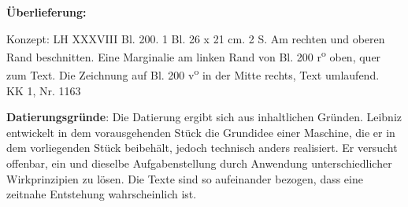       
               
                \begin{ledgroupsized}[r]{120mm}
                \footnotesize 
                \pstart                
                \noindent\textbf{\"{U}berlieferung:}   
                \pend
                \end{ledgroupsized}
            
              
                            \begin{ledgroupsized}[r]{114mm}
                            \footnotesize 
                            \pstart \parindent -6mm
                            Konzept: LH XXXVIII Bl. 200. 1 Bl. 26 x 21 cm. 2 S. Am rechten und oberen Rand beschnitten. Eine Marginalie am linken Rand von Bl. 200 r\textsuperscript{o} oben, quer zum Text. Die Zeichnung auf Bl. 200 v\textsuperscript{o} in der Mitte rechts, Text umlaufend.\\KK 1, Nr. 1163 \pend
                            \end{ledgroupsized}
                \vspace*{5mm}
                \begin{ledgroup}
                \footnotesize 
                \pstart
            \noindent\footnotesize{\textbf{Datierungsgr\"{u}nde}: Die Datierung ergibt sich aus inhaltlichen Gr\"{u}nden. Leibniz entwickelt in dem vorausgehenden St\"{u}ck die Grundidee einer Maschine, die er in dem vorliegenden St\"{u}ck beibeh\"{a}lt, jedoch technisch anders realisiert. Er versucht offenbar, ein und dieselbe Aufgabenstellung durch Anwendung unterschiedlicher Wirkprinzipien zu l\"{o}sen. Die Texte sind so auf\-einander bezogen, dass eine zeitnahe Entstehung wahrscheinlich ist.}
                \pend
                \end{ledgroup}
            
